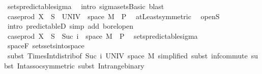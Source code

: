 \begin{isabellebody}
\ sets{\isacharunderscore}{\kern0pt}predictable{\isacharunderscore}{\kern0pt}sigma\ \isamarkupfalse%
\ {\isacharparenleft}{\kern0pt}intro\ sigma{\isacharunderscore}{\kern0pt}sets{\isachardot}{\kern0pt}Basic{\isacharparenright}{\kern0pt}\ blast\isanewline
\ \ \isamarkupfalse%
\ \isamarkupfalse%
\ {\isachardoublequoteopen}case{\isacharunderscore}{\kern0pt}prod\ X\ {\isacharminus}{\kern0pt}{\isacharbackquote}{\kern0pt}\ S\ {\isasyminter}\ {\isacharparenleft}{\kern0pt}UNIV\ {\isasymtimes}\ space\ M{\isacharparenright}{\kern0pt}\ {\isasymin}\ {\isasymSigma}\isactrlsub P{\isachardoublequoteclose}\ \isamarkupfalse%
\ atLeast{\isacharunderscore}{\kern0pt}{}{\isacharbrackleft}{\kern0pt}symmetric{\isacharbrackright}{\kern0pt}\ \isamarkupfalse%
\ open{\isacharunderscore}{\kern0pt}S\ \isamarkupfalse%
\ {\isacharparenleft}{\kern0pt}intro\ predictableD{\isacharcomma}{\kern0pt}\ simp\ add{\isacharcolon}{\kern0pt}\ borel{\isacharunderscore}{\kern0pt}open{\isacharparenright}{\kern0pt}\isanewline
\ \ \isamarkupfalse%
\ \isamarkupfalse%
\ {\isachardoublequoteopen}case{\isacharunderscore}{\kern0pt}prod\ X\ {\isacharminus}{\kern0pt}{\isacharbackquote}{\kern0pt}\ S\ {\isasyminter}\ {\isacharparenleft}{\kern0pt}{\isacharbraceleft}{\kern0pt}Suc\ i{\isacharbraceright}{\kern0pt}\ {\isasymtimes}\ space\ M{\isacharparenright}{\kern0pt}\ {\isasymin}\ {\isasymSigma}\isactrlsub P{\isachardoublequoteclose}\ \isamarkupfalse%
\ sets{\isacharunderscore}{\kern0pt}predictable{\isacharunderscore}{\kern0pt}sigma\ \isamarkupfalse%
\ space{\isacharunderscore}{\kern0pt}F\ sets{\isachardot}{\kern0pt}sets{\isacharunderscore}{\kern0pt}into{\isacharunderscore}{\kern0pt}space\isanewline
\ \ \ \ \isamarkupfalse%
\ {\isacharparenleft}{\kern0pt}subst\ Times{\isacharunderscore}{\kern0pt}Int{\isacharunderscore}{\kern0pt}distrib{}{\isacharbrackleft}{\kern0pt}of\ {\isachardoublequoteopen}{\isacharbraceleft}{\kern0pt}Suc\ i{\isacharbraceright}{\kern0pt}{\isachardoublequoteclose}\ UNIV\ {\isachardoublequoteopen}space\ M{\isachardoublequoteclose}{\isacharcomma}{\kern0pt}\ simplified{\isacharbrackright}{\kern0pt}{\isacharcomma}{\kern0pt}\ subst\ inf{\isachardot}{\kern0pt}commute{\isacharcomma}{\kern0pt}\ subst\ Int{\isacharunderscore}{\kern0pt}assoc{\isacharbrackleft}{\kern0pt}symmetric{\isacharbrackright}{\kern0pt}{\isacharcomma}{\kern0pt}\ subst\ Int{\isacharunderscore}{\kern0pt}range{\isacharunderscore}{\kern0pt}binary{\isacharparenright}{\kern0pt}\ \isanewline

\end{isabellebody}
